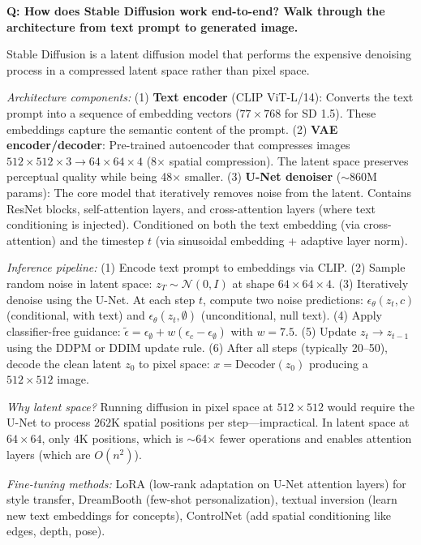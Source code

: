\begin{interviewq}
\textbf{Q: How does Stable Diffusion work end-to-end? Walk through the architecture from text prompt to generated image.}

 \quad {} \quad \badgefreq{\freqhigh}

\stronganswer Stable Diffusion is a latent diffusion model that performs the expensive denoising process in a compressed latent space rather than pixel space.

\textit{Architecture components:} (1) \textbf{Text encoder} (CLIP ViT-L/14): Converts the text prompt into a sequence of embedding vectors ($77 \times 768$ for SD 1.5). These embeddings capture the semantic content of the prompt. (2) \textbf{VAE encoder/decoder}: Pre-trained autoencoder that compresses images $512 \times 512 \times 3 \to 64 \times 64 \times 4$ (8$\times$ spatial compression). The latent space preserves perceptual quality while being 48$\times$ smaller. (3) \textbf{U-Net denoiser} ($\sim$860M params): The core model that iteratively removes noise from the latent. Contains ResNet blocks, self-attention layers, and cross-attention layers (where text conditioning is injected). Conditioned on both the text embedding (via cross-attention) and the timestep $t$ (via sinusoidal embedding + adaptive layer norm).

\textit{Inference pipeline:} (1) Encode text prompt to embeddings via CLIP. (2) Sample random noise in latent space: $z_T \sim \mathcal{N}(0, I)$ at shape $64 \times 64 \times 4$. (3) Iteratively denoise using the U-Net. At each step $t$, compute two noise predictions: $\epsilon_\theta(z_t, c)$ (conditional, with text) and $\epsilon_\theta(z_t, \emptyset)$ (unconditional, null text). (4) Apply classifier-free guidance: $\tilde{\epsilon} = \epsilon_\emptyset + w(\epsilon_c - \epsilon_\emptyset)$ with $w = 7.5$. (5) Update $z_t \to z_{t-1}$ using the DDPM or DDIM update rule. (6) After all steps (typically 20--50), decode the clean latent $z_0$ to pixel space: $x = \text{Decoder}(z_0)$ producing a $512 \times 512$ image.

\textit{Why latent space?} Running diffusion in pixel space at $512 \times 512$ would require the U-Net to process $262\text{K}$ spatial positions per step---impractical. In latent space at $64 \times 64$, only $4\text{K}$ positions, which is $\sim$64$\times$ fewer operations and enables attention layers (which are $O(n^2)$).

\textit{Fine-tuning methods:} LoRA (low-rank adaptation on U-Net attention layers) for style transfer, DreamBooth (few-shot personalization), textual inversion (learn new text embeddings for concepts), ControlNet (add spatial conditioning like edges, depth, pose).


\end{interviewq}

